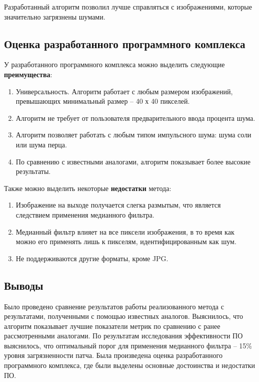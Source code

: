 Разработанный алгоритм позволил лучше справляться с изображениями, которые значительно загрязнены шумами.

\subsection{Оценка разработанного программного комплекса}
У разработанного программного комплекса можно выделить следующие \textbf{преимущества}:
\begin{enumerate}
	\item Универсальность. Алгоритм работает с любым размером изображений, превышающих минимальный размер -- 40 х 40 пикселей.
	\item Алгоритм не требует от пользователя предварительного ввода процента шума.
	\item Алгоритм позволяет работать с любым типом импульсного шума: шума соли или шума перца.
	\item По сравнению с известными аналогами, алгоритм показывает более высокие результаты.
\end{enumerate}

Также можно выделить некоторые \textbf{недостатки} метода:
\begin{enumerate}
	\item Изображение на выходе получается слегка размытым, что является следствием применения медианного фильтра.
	\item Медианный фильтр влияет на все пиксели изображения, в то время как можно его применять лишь к пикселям, идентифицированным как шум.
	\item Не поддерживаются другие форматы, кроме JPG.
\end{enumerate}

\subsection*{Выводы}
Было проведено сравнение результатов работы реализованного метода с результатами, полученными с помощью известных аналогов.
Выяснилось, что алгоритм показывает лучшие показатели метрик по сравнению с ранее рассмотренными аналогами.
По результатам исследования эффективности ПО выяснилось, что оптимальный порог для применения медианного фильтра -- 15\% уровня загрязненности патча.
Была произведена оценка разработанного программного комплекса, где были выделены основные достоинства и недостатки ПО.